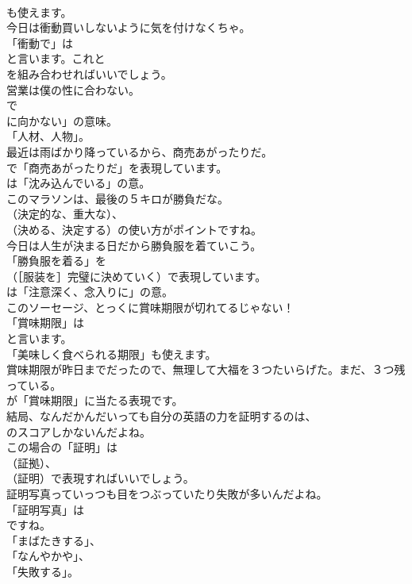 \documentclass[8pt]{extreport}
\begin{document}
\begin{CJK}{UTF8}{min}
\\	も使えます。	
\\	今日は衝動買いしないように気を付けなくちゃ。 
\\	「衝動で」は
\\	と言います。これと
\\	を組み合わせればいいでしょう。	
\\	営業は僕の性に合わない。 
\\	で
\\	に向かない」の意味。
\\	「人材、人物」。	
\\	最近は雨ばかり降っているから、商売あがったりだ。 
\\	で「商売あがったりだ」を表現しています。
\\	は「沈み込んでいる」の意。	
\\	このマラソンは、最後の５キロが勝負だな。 
\\	（決定的な、重大な）、
\\	（決める、決定する）の使い方がポイントですね。	
\\	今日は人生が決まる日だから勝負服を着ていこう。 
\\	「勝負服を着る」を 
\\	（［服装を］完璧に決めていく）で表現しています。
\\	は「注意深く、念入りに」の意。	
\\	このソーセージ、とっくに賞味期限が切れてるじゃない！ 
\\	「賞味期限」は
\\	と言います。
\\	「美味しく食べられる期限」も使えます。	
\\	賞味期限が昨日までだったので、無理して大福を３つたいらげた。まだ、３つ残っている。 
\\	が「賞味期限」に当たる表現です。	
\\	結局、なんだかんだいっても自分の英語の力を証明するのは、
\\	のスコアしかないんだよね。 
\\	この場合の「証明」は
\\	（証拠）、
\\	（証明）で表現すればいいでしょう。	
\\	証明写真っていっつも目をつぶっていたり失敗が多いんだよね。 
\\	「証明写真」は
\\	ですね。
\\	「まばたきする」、
\\	「なんやかや」、
\\	「失敗する」。	

\end{CJK}
\end{document}

